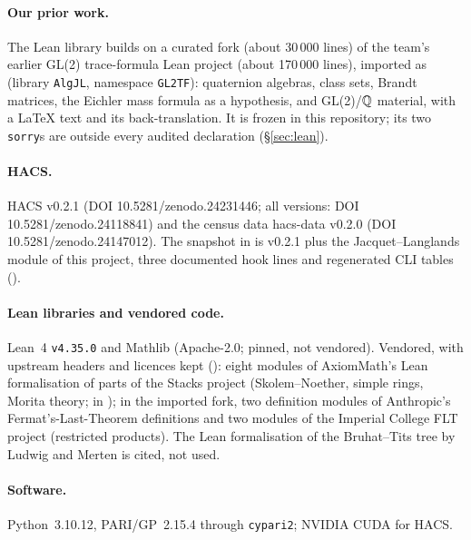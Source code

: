 \paragraph{Our prior work.} The Lean library builds on a curated fork (about 30\,000 lines) of the team's earlier GL(2)
trace-formula Lean project (about 170\,000 lines), imported as  (library
\texttt{AlgJL}, namespace \texttt{GL2TF}): quaternion algebras, class sets, Brandt matrices, the Eichler mass formula as a
hypothesis, and GL(2)/$\mathbb{Q}$ material, with a LaTeX text and its back-translation. It is frozen in this repository; its two
\texttt{sorry}s are outside every audited declaration (\S\ref{sec:lean}).

\paragraph{HACS.} HACS v0.2.1 \cite{HACS021} (DOI 10.5281/zenodo.24231446; all versions: DOI 10.5281/zenodo.24118841) and
the census data hacs-data v0.2.0 \cite{HACSdata020} (DOI 10.5281/zenodo.24147012). The snapshot in  is
v0.2.1 plus the Jacquet--Langlands module of this project, three documented hook lines and regenerated CLI tables
().

\paragraph{Lean libraries and vendored code.} Lean~4 \texttt{v4.35.0} and Mathlib \cite{Mathlib20} (Apache-2.0; pinned, not
vendored). Vendored, with upstream headers and licences kept (): eight modules of AxiomMath's
Lean formalisation of parts of the Stacks project \cite{AxiomStacks} (Skolem--Noether, simple rings, Morita theory; in
); in the imported fork, two definition modules of Anthropic's
Fermat's-Last-Theorem definitions \cite{FLTAnthropic} and two modules of the Imperial College FLT project \cite{FLTImperial}
(restricted products). The Lean formalisation of the Bruhat--Tits tree by Ludwig and Merten \cite{LM} is cited, not used.

\paragraph{Software.} Python~3.10.12, PARI/GP~2.15.4 through \texttt{cypari2}; NVIDIA CUDA for HACS.

